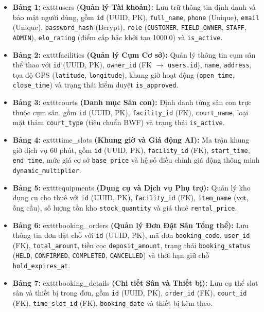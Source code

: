 \begin{itemize}[leftmargin=1.0cm]
    \item \textbf{Bảng 1: }	exttt{users}\textbf{ (Quản lý Tài khoản):} Lưu trữ thông tin định danh và bảo mật người dùng, gồm \texttt{id} (UUID, PK), \texttt{full\_name}, \texttt{phone} (Unique), \texttt{email} (Unique), \texttt{password\_hash} (Bcrypt), \texttt{role} (\texttt{CUSTOMER}, \texttt{FIELD\_OWNER}, \texttt{STAFF}, \texttt{ADMIN}), \texttt{elo\_rating} (điểm cấp bậc khởi tạo 1000.0) và \texttt{is\_active}.
    \item \textbf{Bảng 2: }	exttt{facilities}\textbf{ (Quản lý Cụm Cơ sở):} Quản lý thông tin cụm sân thể thao với \texttt{id} (UUID, PK), \texttt{owner\_id} (FK $\rightarrow$ \texttt{users.id}), \texttt{name}, \texttt{address}, tọa độ GPS (\texttt{latitude}, \texttt{longitude}), khung giờ hoạt động (\texttt{open\_time}, \texttt{close\_time}) và trạng thái kiểm duyệt \texttt{is\_approved}.
    \item \textbf{Bảng 3: }	exttt{courts}\textbf{ (Danh mục Sân con):} Định danh từng sân con trực thuộc cụm sân, gồm \texttt{id} (UUID, PK), \texttt{facility\_id} (FK), \texttt{court\_name}, loại mặt thảm \texttt{court\_type} (tiêu chuẩn BWF) và trạng thái \texttt{is\_active}.
    \item \textbf{Bảng 4: }	exttt{time\_slots}\textbf{ (Khung giờ và Giá động AI):} Ma trận khung giờ dịch vụ 60 phút, gồm \texttt{id} (UUID, PK), \texttt{facility\_id} (FK), \texttt{start\_time}, \texttt{end\_time}, mức giá cơ sở \texttt{base\_price} và hệ số điều chỉnh giá động thông minh \texttt{dynamic\_multiplier}.
    \item \textbf{Bảng 5: }	exttt{equipments}\textbf{ (Dụng cụ và Dịch vụ Phụ trợ):} Quản lý kho dụng cụ cho thuê với \texttt{id} (UUID, PK), \texttt{facility\_id} (FK), \texttt{item\_name} (vợt, ống cầu), số lượng tồn kho \texttt{stock\_quantity} và giá thuê \texttt{rental\_price}.
    \item \textbf{Bảng 6: }	exttt{booking\_orders}\textbf{ (Quản lý Đơn Đặt Sân Tổng thể):} Lưu thông tin đơn đặt chỗ với \texttt{id} (UUID, PK), mã đơn \texttt{booking\_code}, \texttt{user\_id} (FK), \texttt{total\_amount}, tiền cọc \texttt{deposit\_amount}, trạng thái \texttt{booking\_status} (\texttt{HELD}, \texttt{CONFIRMED}, \texttt{COMPLETED}, \texttt{CANCELLED}) và thời hạn giữ chỗ \texttt{hold\_expires\_at}.
    \item \textbf{Bảng 7: }	exttt{booking\_details}\textbf{ (Chi tiết Sân và Thiết bị):} Lưu cụ thể slot sân và thiết bị trong đơn, gồm \texttt{id} (UUID, PK), \texttt{order\_id} (FK), \texttt{court\_id} (FK), \texttt{time\_slot\_id} (FK), \texttt{booking\_date} và thiết bị kèm theo.

\end{itemize}

